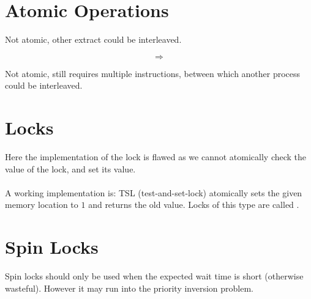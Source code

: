 \documentclass{report}
\begin{document}
    \section*{Atomic Operations}
        \begin{minipage}[t]{0.4 \textwidth}
            Not atomic, other extract could be interleaved.
        \end{minipage}
        \begin{minipage}[t]{0.2 \textwidth}
            \begin{huge}
                \[\Rightarrow\]
            \end{huge}
        \end{minipage}
        \begin{minipage}[t]{0.4 \textwidth}
            Not atomic, still requires multiple instructions, between which another process could be interleaved.
        \end{minipage}
    \section*{Locks}
        Here the implementation of the lock is flawed as we cannot atomically check the value of the lock, and set its value.
        \\
        \\ A working implementation is:
        TSL (test-and-set-lock) atomically sets the given memory location to $1$ and returns the old value. Locks of this type are called .
    \section*{Spin Locks}
        Spin locks should only be used when the expected wait time is short (otherwise wasteful). However it may run into the priority inversion problem.
\end{document}

